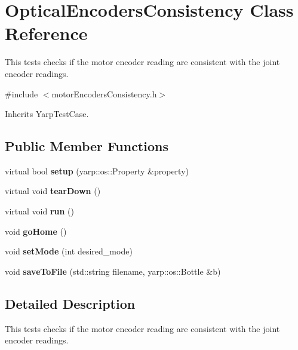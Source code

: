 \section{Optical\+Encoders\+Consistency Class Reference}
\label{classOpticalEncodersConsistency}


This tests checks if the motor encoder reading are consistent with the joint encoder readings.  




{\ttfamily \#include $<$motor\+Encoders\+Consistency.\+h$>$}



Inherits Yarp\+Test\+Case.

\subsection*{Public Member Functions}
\begin{DoxyCompactItemize}
\item 
\label{classOpticalEncodersConsistency_a51df63f87479ffa4f2f05c99f9c06863} 
virtual bool {\bfseries setup} (yarp\+::os\+::\+Property \&property)
\item 
\label{classOpticalEncodersConsistency_a8751028fa2a3bb23acc51693f47a9b75} 
virtual void {\bfseries tear\+Down} ()
\item 
\label{classOpticalEncodersConsistency_a372d7c32a10225fcda5e6621c6494ad7} 
virtual void {\bfseries run} ()
\item 
\label{classOpticalEncodersConsistency_a1b18ff12291b46dddca9e0a11584887d} 
void {\bfseries go\+Home} ()
\item 
\label{classOpticalEncodersConsistency_ae1e7c3909700d9a39fe9dad1b4f5c9d5} 
void {\bfseries set\+Mode} (int desired\+\_\+mode)
\item 
\label{classOpticalEncodersConsistency_a7afe73617f00256e49c9a3c506f481a7} 
void {\bfseries save\+To\+File} (std\+::string filename, yarp\+::os\+::\+Bottle \&b)
\end{DoxyCompactItemize}


\subsection{Detailed Description}
This tests checks if the motor encoder reading are consistent with the joint encoder readings. 

